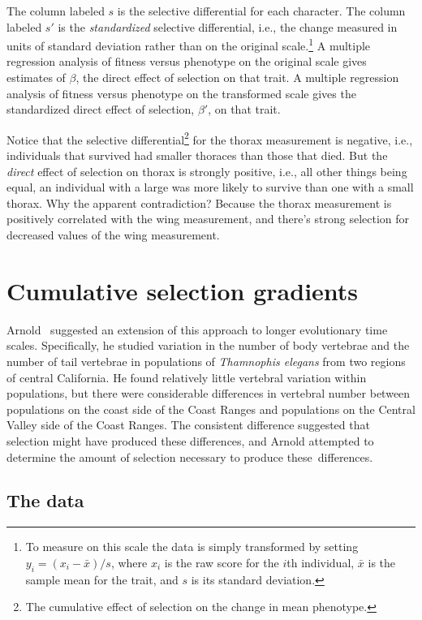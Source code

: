 The column labeled $s$ is the selective differential for each
character. The column labeled $s'$ is the {\it standardized\/}
selective differential, i.e., the change measured in units of standard
deviation rather than on the original scale.\footnote{To measure on
  this scale the data is simply transformed by setting $y_i = (x_i -
  \bar x)/s$, where $x_i$ is the raw score for the $i$th individual,
  $\bar x$ is the sample mean for the trait, and $s$ is its standard
  deviation.} A multiple regression analysis of fitness versus
phenotype on the original scale gives estimates of $\beta$, the direct
effect of selection on that trait. A multiple regression analysis of
fitness versus phenotype on the transformed scale gives the
standardized direct effect of selection, $\beta'$, on that trait.

Notice that the selective differential\footnote{The cumulative effect
  of selection on the change in mean phenotype.} for the thorax
measurement is negative, i.e., individuals that survived had smaller
thoraces than those that died. But the {\it direct\/} effect of
selection on thorax is strongly positive, i.e., all other things being
equal, an individual with a large was more likely to survive than one
with a small thorax. Why the apparent contradiction? Because the
thorax measurement is positively correlated with the wing measurement,
and there's strong selection for decreased values of the wing
measurement.

\section*{Cumulative selection gradients}

Arnold~\cite{Arnold-1988} suggested an extension of this approach to
longer evolutionary time scales. Specifically, he studied variation in
the number of body vertebrae and the number of tail vertebrae in
populations of {\it Thamnophis elegans} from two regions of central
California. He found relatively little vertebral variation within
populations, but there were considerable differences in vertebral
number between populations on the coast side of the Coast Ranges and
populations on the Central Valley side of the Coast Ranges. The
consistent difference suggested that selection might have produced
these differences, and Arnold attempted to determine the amount of
selection necessary to produce these~differences.

\subsection*{The data}

